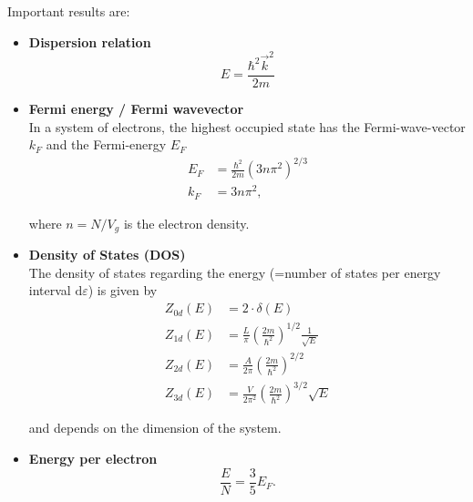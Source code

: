 \documentclass{article}
\newcommand{\diff}{\mathrm{d}}
\newcommand{\lr}[1]{\left(#1\right)}
\begin{document}
Important results are:
	\begin{itemize}
		\item \textbf{Dispersion relation}
			\begin{equation}
				E = \frac{\hbar^2\vec{k}^2}{2m}
			\end{equation}


		\item \textbf{Fermi energy / Fermi wavevector}\\
		In a system of electrons, the highest occupied state has the Fermi-wave-vector $k_F$ and the Fermi-energy $E_F$
			\begin{align}
				E_F &= \frac{\hbar^2}{2m}(3n\pi^2)^{2/3}\\
				k_F &= 3n\pi^2,
			\end{align}

		where $n = N/V_g$ is the electron density.\\
		
		
		\item \textbf{Density of States (DOS)}\\
		The density of states regarding the energy \textcolor{gruen}{(=number of states per energy interval $\diff\varepsilon$)} is given by
			\begin{align}
				Z_{0d}(E) &= 2\cdot \delta(E) \\
				Z_{1d}(E) &= \frac{L}{\pi} \lr{\frac{2m}{\hbar^2}}^{1/2} \frac{1}{\sqrt{E}} \\
				Z_{2d}(E) &= \frac{A}{2\pi} \lr{\frac{2m}{\hbar^2}}^{2/2} \\
				Z_{3d}(E) &= \frac{V}{2\pi^2} \lr{ \frac{2m}{\hbar^2} }^{3/2} \sqrt{E}
			\end{align}
		
		and depends on the dimension of the system.
		
		
		\item \textbf{Energy per electron}
			\begin{equation}
				\frac{E}{N} = \frac{3}{5} E_F.
			\end{equation}
	\end{itemize}


\newpage
\end{document}
